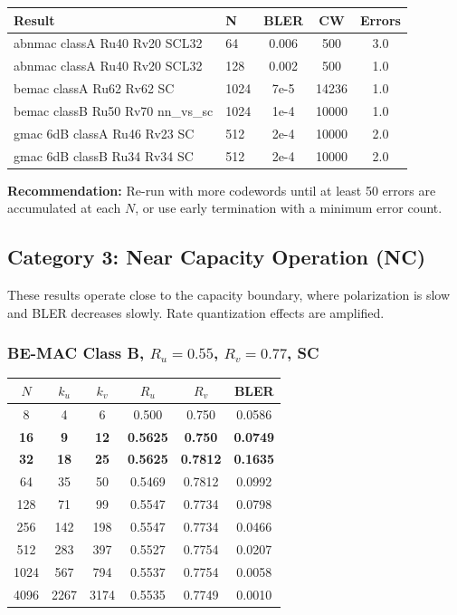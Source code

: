 \documentclass[11pt,a4paper]{article}
\newcommand{\up}[1]{\textcolor{upcolor}{\textbf{#1}}}
\begin{document}
\begin{tabular}{llccc}
\toprule
\textbf{Result} & \textbf{N} & \textbf{BLER} & \textbf{CW} & \textbf{Errors} \\
\midrule
abnmac classA Ru40 Rv20 SCL32 & 64 & 0.006 & 500 & 3.0 \\
abnmac classA Ru40 Rv20 SCL32 & 128 & 0.002 & 500 & 1.0 \\
bemac classA Ru62 Rv62 SC & 1024 & 7e-5 & 14236 & 1.0 \\
bemac classB Ru50 Rv70 nn\_vs\_sc & 1024 & 1e-4 & 10000 & 1.0 \\
gmac 6dB classA Ru46 Rv23 SC & 512 & 2e-4 & 10000 & 2.0 \\
gmac 6dB classB Ru34 Rv34 SC & 512 & 2e-4 & 10000 & 2.0 \\
\bottomrule
\end{tabular}

\textbf{Recommendation:} Re-run with more codewords until at least 50 errors are accumulated at each $N$, or use early termination with a minimum error count.

\subsection{Category 3: Near Capacity Operation (NC)}

These results operate close to the capacity boundary, where polarization is slow and BLER decreases slowly. Rate quantization effects are amplified.

\subsubsection{BE-MAC Class B, $R_u=0.55$, $R_v=0.77$, SC}

\begin{tabular}{cccccc}
\toprule
$N$ & $k_u$ & $k_v$ & $R_u$ & $R_v$ & BLER \\
\midrule
8 & 4 & 6 & 0.500 & 0.750 & 0.0586 \\
\textbf{16} & \textbf{9} & \textbf{12} & \textbf{0.5625} & \textbf{0.750} & \up{0.0749} \\
\textbf{32} & \textbf{18} & \textbf{25} & \textbf{0.5625} & \textbf{0.7812} & \up{0.1635} \\
64 & 35 & 50 & 0.5469 & 0.7812 & 0.0992 \\
128 & 71 & 99 & 0.5547 & 0.7734 & 0.0798 \\
256 & 142 & 198 & 0.5547 & 0.7734 & 0.0466 \\
512 & 283 & 397 & 0.5527 & 0.7754 & 0.0207 \\
1024 & 567 & 794 & 0.5537 & 0.7754 & 0.0058 \\
4096 & 2267 & 3174 & 0.5535 & 0.7749 & 0.0010 \\
\bottomrule
\end{tabular}
\end{document}
